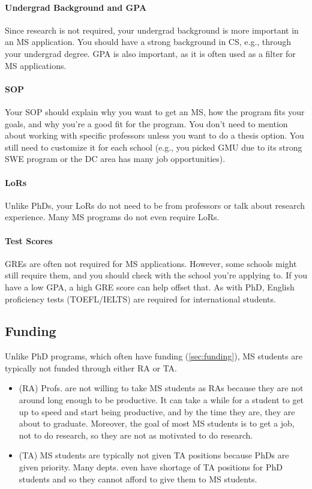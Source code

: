 \documentclass[oneside,11pt,dvipsnames]{book}
\begin{document}
\paragraph{Undergrad Background and GPA} Since research is not required, your undergrad background is more important in an MS application.  You should have a strong background in CS, e.g., through your undergrad degree.  GPA is also important, as it is often used as a filter for MS applications.

\paragraph{SOP} Your SOP should explain why you want to get an MS, how the program fits your goals, and why you're a good fit for the program.  You don't need to mention about working with specific professors unless you want to do a thesis option. You still need to customize it for each school (e.g., you picked GMU due to its strong SWE program or the DC area has many job opportunities).

\paragraph{LoRs} Unlike PhDs, your LoRs do not need to be from professors or talk about research experience. Many MS programs do not even require LoRs.

\paragraph{Test Scores} GREs are often not required for MS applications.  However, some schools might still require them, and you should check with the school you're applying to.  If you have a low GPA, a high GRE score can help offset that. As with PhD, English proficiency tests (TOEFL/IELTS) are required for international students.

\subsection{Funding}\label{sec:ms-funding}
Unlike PhD programs, which often have funding (\autoref{sec:funding}), MS students are typically not funded through either RA or TA.
\begin{itemize}
\item (RA) Profs. are not willing to take MS students as RAs because they are not around long enough to be productive. It can take a while for a student to get up to speed and start being productive, and by the time they are, they are about to graduate. Moreover, the goal of most MS students is to get a job, not to do research, so they are not as motivated to do research.
\item (TA) MS students are typically not given TA positions because PhDs are given priority. Many depts. even have shortage of TA positions for PhD students and so they cannot afford to give them to MS students.
\end{itemize}
\end{document}
